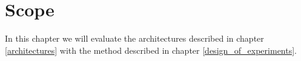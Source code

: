 \section{Scope}
In this chapter we will evaluate the architectures described in chapter \ref{architectures} with the method described in chapter \ref{design_of_experiments}.
